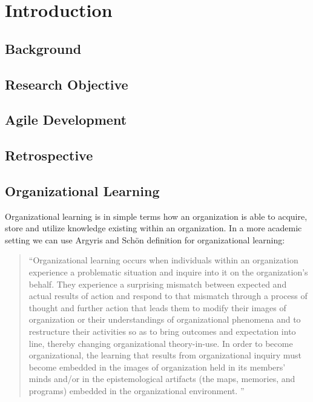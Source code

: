 \chapter{Introduction}
\section{Background}
\section{Research Objective}
\section{Agile Development}
\section{Retrospective}
\section{Organizational Learning}
Organizational learning is in simple terms how an organization is able to acquire, store and utilize knowledge existing within an organization. In a more academic setting we can use Argyris and Schön definition \cite{Argyris1996} for organizational learning: 

\begin{quote}
	``Organizational learning occurs when individuals within an organization experience a problematic situation and inquire into it on the organization's behalf. They experience a surprising mismatch between expected and actual results of action and respond to that mismatch through a process of thought and further action that leads them to modify their images of organization or their understandings of organizational phenomena and to restructure their activities so as to bring outcomes and expectation into line, thereby changing organizational theory-in-use. In order to become organizational, the learning that results from organizational inquiry must become embedded in the images of organization held in its members' minds and/or in the epistemological artifacts (the maps, memories, and programs) embedded in the organizational environment. ''
\end{quote}

